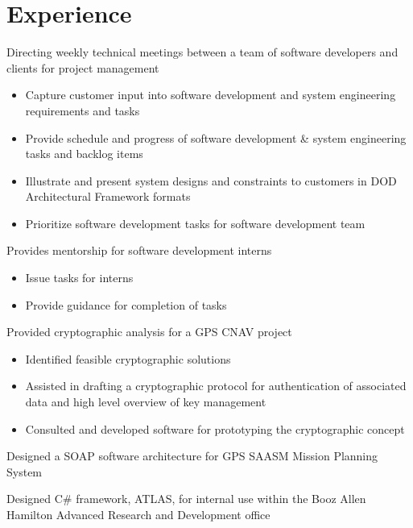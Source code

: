 \documentclass[letterpaper]{clinton-resume}
\begin{document}
\begin{minipage}[t]{0.66\textwidth}
\section{Experience}


\vspace{\topsep} %
\begin{tightitemize}
\item Directing weekly technical meetings between a team of software developers and clients for project management
	\begin{itemize}
	\item Capture customer input into software development and system engineering requirements and tasks
	\item Provide schedule and progress of software development \& system engineering tasks and backlog items
	\item Illustrate and present system designs and constraints to customers in DOD Architectural Framework formats
	\item Prioritize software development tasks for software development team
	\end{itemize}
\item Provides mentorship for software development interns
	\begin{itemize}
	\item Issue tasks for interns
	\item Provide guidance for completion of tasks
	\end{itemize}
\item Provided cryptographic analysis for a GPS CNAV project
	\begin{itemize}
	\item Identified feasible cryptographic solutions
	\item Assisted in drafting a cryptographic protocol for authentication of associated data and high level overview of key management
	\item Consulted and developed software for prototyping the cryptographic concept
	\end{itemize}
\item Designed a SOAP software architecture for GPS SAASM Mission Planning System
\item Designed C\# framework, ATLAS, for internal use within the Booz Allen Hamilton Advanced Research and Development office

\end{tightitemize}
\end{minipage}
\end{document}
